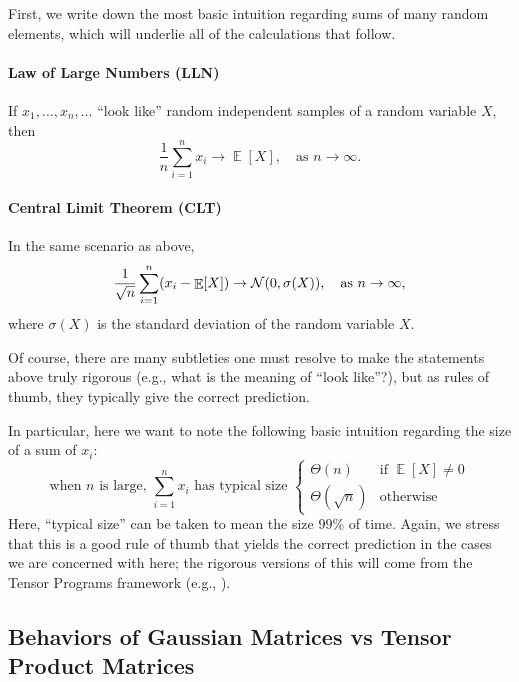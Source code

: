 \documentclass{article}
\theoremstyle{definition}
\DeclareMathOperator*{\EV}{\mathbb{E}}
\begin{document}
    First, we write down the most basic intuition regarding sums of many random elements, which will underlie all of the calculations that follow.

    \paragraph{Law of Large Numbers (LLN)}
    If $x_1, \ldots, x_n, \ldots$ ``look like'' random independent samples of a random variable $X$, then
    \[
      \frac 1 n \sum_{i=1}^n x_i \to \EV[X],\quad \text{as $n\to\infty$}.\]

    \paragraph{Central Limit Theorem (CLT)}
    In the same scenario as above,
    \[
      \frac 1 {\sqrt{n}} \sum_{i=1}^n (x_i-\EV[X]) \to \Gaus(0, \sigma(X)),\quad \text{as $n\to\infty$},\]
    where $\sigma(X)$ is the standard deviation of the random variable $X$.

    Of course, there are many subtleties one must resolve to make the statements above truly rigorous (e.g., what is the meaning of ``look like''?), but as rules of thumb, they typically give the correct prediction.

    In particular, here we want to note the following basic intuition regarding the size of a sum of $x_i$:
    \[
      \text{when $n$ is large, }
      \sum_{i=1}^n x_i \text{ has typical size }
      \begin{cases}
        \Theta(n) & \text{if $\EV[X] \ne 0$}\\
        \Theta(\sqrt n) & \text{otherwise}
      \end{cases}
    \]
    Here, ``typical size'' can be taken to mean the size $99\%$ of time.
    Again, we stress that this is a good rule of thumb that yields the correct prediction in the cases we are concerned with here; the rigorous versions of this will come from the Tensor Programs framework (e.g., \citep{TP3}).
    
    \subsection{Behaviors of Gaussian Matrices vs Tensor Product Matrices}
    \label{sec:GausVsTensorProducts}
    
\end{document}
